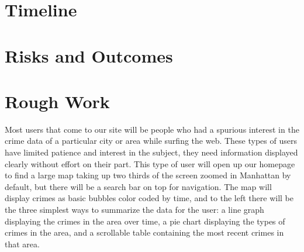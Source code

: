 \documentclass[paper=a4, fontsize=11pt]{scrartcl} %
\numberwithin{equation}{section} %
\numberwithin{figure}{section} %
\numberwithin{table}{section} %
\begin{document}
\section{Timeline}


\subsection{}


\subsubsection{}


\section{Risks and Outcomes}


\subsection{}


\subsubsection{}




\section{Rough Work}

Most users that come to our site will be people who had a spurious interest in the crime data of a particular city or area while surfing the web. These types of users have limited patience and interest in the subject, they need information displayed clearly without effort on their part. This type of user will open up our homepage to find a large map taking up two thirds of the screen zoomed in Manhattan by default, but there will be a search bar on top for navigation. The map will display crimes as basic bubbles color coded by time, and to the left there will be the three simplest ways to summarize the data for the user: a line graph displaying the crimes in the area over time, a pie chart displaying the types of crimes in the area, and a scrollable table containing the most recent crimes in that area. \\
\end{document}
